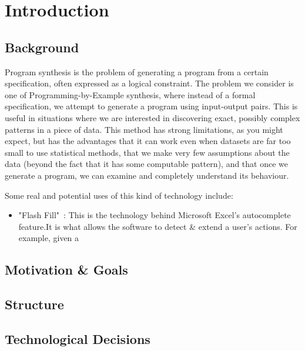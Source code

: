 \section{Introduction}


\subsection{Background}

Program synthesis is the problem of generating a program from a certain specification, often expressed as a logical constraint. The problem we consider is one of Programming-by-Example synthesis, where instead of a formal specification, we attempt to generate a program using input-output pairs. This is useful in situations where we are interested in discovering exact, possibly complex patterns in a piece of data. This method has strong limitations, as you might expect, but has the advantages that it can work even when datasets are far too small to use statistical methods, that we make very few assumptions about the data (beyond the fact that it has some computable pattern), and that once we generate a program, we can examine and completely understand its behaviour.

Some real and potential uses of this kind of technology include:

\begin{itemize}
  \item "Flash Fill"~\cite{gulwani2017program}: This is the technology behind Microsoft Excel's autocomplete feature.It is what allows the software to detect \& extend a user's actions. For example, given a 
  
\end{itemize}

\subsection{Motivation \& Goals}

\subsection{Structure}

\subsection{Technological Decisions}

